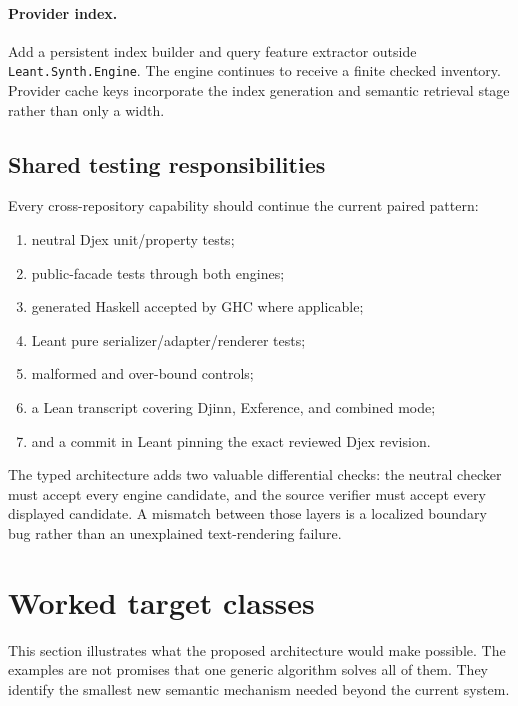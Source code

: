 \documentclass[11pt]{article}
\newcommand{\code}[1]{\texttt{#1}}
\newcommand{\Djex}{\textsf{Djex}}
\newcommand{\Leant}{\textsf{Leant}}
\newcommand{\Djinn}{Djinn}
\newcommand{\Exference}{Exference}
\begin{document}
\paragraph{Provider index.}

Add a persistent index builder and query feature extractor outside
\code{Leant.Synth.Engine}.  The engine continues to receive a finite checked
inventory.  Provider cache keys incorporate the index generation and semantic
retrieval stage rather than only a width.

\subsection{Shared testing responsibilities}

Every cross-repository capability should continue the current paired pattern:

\begin{enumerate}
  \item neutral \Djex{} unit/property tests;
  \item public-facade tests through both engines;
  \item generated Haskell accepted by GHC where applicable;
  \item \Leant{} pure serializer/adapter/renderer tests;
  \item malformed and over-bound controls;
  \item a Lean transcript covering \Djinn{}, \Exference{}, and combined mode;
  \item and a commit in \Leant{} pinning the exact reviewed \Djex{} revision.
\end{enumerate}

The typed architecture adds two valuable differential checks: the neutral
checker must accept every engine candidate, and the source verifier must accept
every displayed candidate.  A mismatch between those layers is a localized
boundary bug rather than an unexplained text-rendering failure.

\section{Worked target classes}
\label{sec:targets}

This section illustrates what the proposed architecture would make possible.
The examples are not promises that one generic algorithm solves all of them.
They identify the smallest new semantic mechanism needed beyond the current
system.
\end{document}
